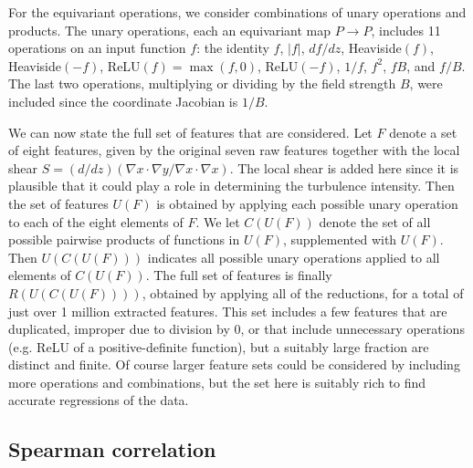 \documentclass{jpp}
\begin{document}
For the equivariant operations, we consider combinations of unary operations and products.
The unary operations, each an equivariant map $P \to P$, includes 11 operations on an input function $f$:
the identity $f$, $|f|$, $df/dz$, Heaviside$(f)$, Heaviside$(-f)$, ReLU$(f) = \max(f,0)$, ReLU$(-f)$, $1/f$, $f^2$, $fB$, and $f / B$. 
The last two operations, multiplying or dividing by the field strength $B$, were included since the coordinate Jacobian is $1/B$.

We can now state the full set of features that are considered.
Let $F$ denote a set of eight features, given by the original seven raw features together with the local shear $S = (d/dz)(\nabla x \cdot\nabla y / \nabla x \cdot\nabla x)$.
The local shear \citep{greene1968interchange} is added here since it is plausible that it could play a role in determining the turbulence intensity.
Then the set of features $U(F)$ is obtained by applying each possible unary operation to each of the eight elements of $F$.
We let $C(U(F))$ denote the set of all possible pairwise products of functions in $U(F)$, supplemented with $U(F)$.
Then $U(C(U(F)))$ indicates all possible unary operations applied to all elements of $C(U(F))$.
The full set of features is finally $R(U(C(U(F))))$, obtained by applying all of the reductions, for a total of just over 1 million extracted features.
This set includes a few features that are duplicated, improper due to division by 0, or that include unnecessary operations (e.g. ReLU of a positive-definite function), but a suitably large fraction are distinct and finite.
Of course larger feature sets could be considered by including more operations and combinations, but the set here is suitably rich to find accurate regressions of the data.




\subsection{Spearman correlation}
\label{sec:spearman}
\end{document}

